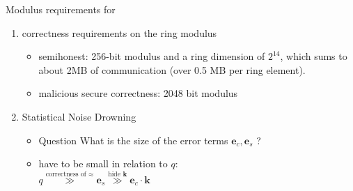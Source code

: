 \documentclass[aspectratio=169, 12pt,handout]{beamer}
\newcommand{\bv}[1]{\mathbf{#1}}
\newcommand{\kkk}{\mathbf{k}}
\begin{document}
% 
% 
% 

\begin{frame}{Modulus requirements for \cite{PKC:ADDS21}}
  \begin{enumerate}
    \item correctness requirements on the ring modulus
      \begin{itemize}
        \item semihonest: 256-bit modulus and a ring dimension of $2^{14}$, which sums to about 2MB
          of communication (over 0.5 MB per ring element). \pause
        \item malicious secure correctness: 2048 bit modulus \pause
      \end{itemize}
    \item Statistical Noise Drowning

      \begin{itemize}
        \item \alert{Question} What is the size of the error terms $\bv{e}_c,
          \bv{e}_s$ ? \pause
        \item have to be small in relation to $q$: \\
          $
          q \overset{\text{correctness of }\approx}{\gg} \bv{e}_s
          \overset{\text{hide } \bv{k}}{\gg} \bv{e}_c \cdot \bv{k}
          $\pause
      \end{itemize}
        \end{enumerate}
\end{frame}
\end{document}
